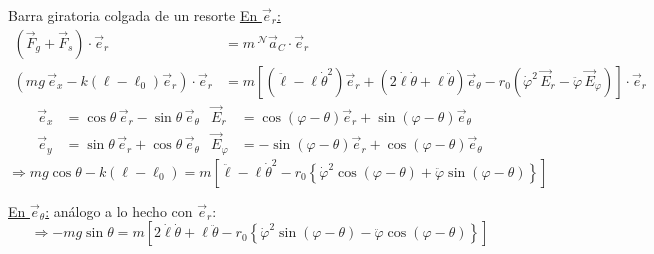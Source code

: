 \begin{solucion}{Barra giratoria colgada de un resorte}
\underline{En $\vec{e}_r$:}
\begin{align*}
(\vec{F}_g + \vec{F}_s) \cdot \vec{e}_r &= m\, {}^{\mathcal{N}}\vec{a}_C \cdot \vec{e}_r \\
(mg\, \vec{e}_x - k(\ell-\ell_0)\vec{e}_r) \cdot \vec{e}_r &= m \left[ (\ddot{\ell} - \ell\dot{\theta}^2)\vec{e}_r + (2\dot{\ell}\dot{\theta} + \ell\ddot{\theta})\vec{e}_\theta - r_0 (\dot{\varphi}^2\, \vec{E}_r - \ddot{\varphi}\, \vec{E}_\varphi) \right] \cdot \vec{e}_r
\end{align*}
\begin{align*}
\vec{e}_x &= \cos\theta\, \vec{e}_r - \sin\theta\, \vec{e}_\theta & \vec{E}_r &= \cos(\varphi-\theta)\vec{e}_r + \sin(\varphi-\theta)\vec{e}_\theta \\
\vec{e}_y &= \sin\theta\, \vec{e}_r + \cos\theta\, \vec{e}_\theta & \vec{E}_\varphi &= -\sin(\varphi-\theta)\vec{e}_r + \cos(\varphi-\theta)\vec{e}_\theta
\end{align*}
\begin{equation*}
\Rightarrow mg\cos\theta - k(\ell-\ell_0) = m \left[ \ddot{\ell} - \ell\dot{\theta}^2 - r_0 \left\{ \dot{\varphi}^2 \cos(\varphi - \theta) + \ddot{\varphi} \sin(\varphi - \theta) \right\} \right]
\end{equation*}

\underline{En $\vec{e}_\theta$:} análogo a lo hecho con $\vec{e}_r$:
\begin{equation*}
\Rightarrow -mg\sin\theta = m \left[ 2\dot{\ell}\dot{\theta} + \ell\ddot{\theta} - r_0 \left\{ \dot{\varphi}^2 \sin(\varphi - \theta) - \ddot{\varphi} \cos(\varphi - \theta) \right\} \right]
\end{equation*}


\end{solucion}
